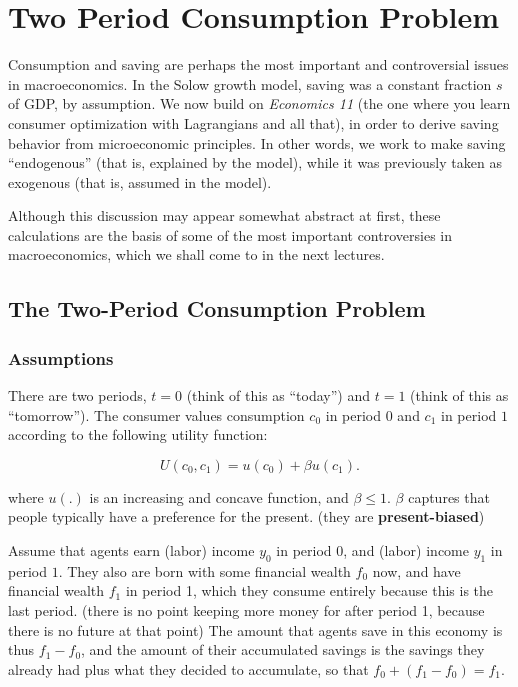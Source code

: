 \documentclass[]{book}
\theoremstyle{definition}
\theoremstyle{definition}
\theoremstyle{definition}
\theoremstyle{remark}
\begin{document}
\hypertarget{two-period}{\chapter{Two Period Consumption
Problem}\label{two-period}}

Consumption and saving are perhaps the most important and controversial
issues in macroeconomics. In the Solow growth model, saving was a
constant fraction \(s\) of GDP, by assumption. We now build on
\emph{Economics 11} (the one where you learn consumer optimization with
Lagrangians and all that), in order to derive saving behavior from
microeconomic principles. In other words, we work to make saving
``endogenous'' (that is, explained by the model), while it was
previously taken as exogenous (that is, assumed in the model).

Although this discussion may appear somewhat abstract at first, these
calculations are the basis of some of the most important controversies
in macroeconomics, which we shall come to in the next lectures.

\section{The Two-Period Consumption
Problem}\label{the-two-period-consumption-problem}

\subsection{Assumptions}\label{assumptions-1}

There are two periods, \(t=0\) (think of this as ``today'') and \(t=1\)
(think of this as ``tomorrow''). The consumer values consumption \(c_0\)
in period \(0\) and \(c_1\) in period \(1\) according to the following
utility function:

\[U(c_{0},c_{1})=u(c_{0})+\beta u(c_{1}).\]

where \(u(.)\) is an increasing and concave function, and
\(\beta \leq 1\). \(\beta\) captures that people typically have a
preference for the present. (they are \textbf{present-biased})

Assume that agents earn (labor) income \(y_{0}\) in period \(0\), and
(labor) income \(y_{1}\) in period \(1\). They also are born with some
financial wealth \(f_{0}\) now, and have financial wealth \(f_{1}\) in
period 1, which they consume entirely because this is the last period.
(there is no point keeping more money for after period 1, because there
is no future at that point) The amount that agents save in this economy
is thus \(f_{1}-f_{0}\), and the amount of their accumulated savings is
the savings they already had plus what they decided to accumulate, so
that \(f_{0}+(f_{1}-f_{0})=f_{1}.\)
\end{document}
